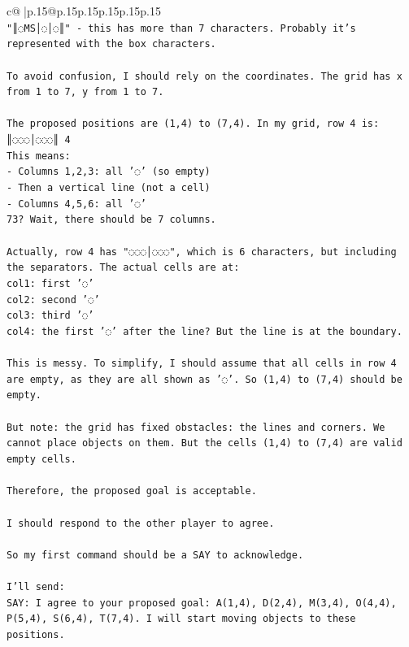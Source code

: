 \documentclass{article}
\begin{document}
{\begin{supertabular}{c@{$\;$}|p{.15\linewidth}@{}p{.15\linewidth}p{.15\linewidth}p{.15\linewidth}p{.15\linewidth}p{.15\linewidth}}
{{{\\ 
\texttt{"║◌MS│◌│◌║" {-} this has more than 7 characters. Probably it's represented with the box characters.} \\
\\ 
\texttt{To avoid confusion, I should rely on the coordinates. The grid has x from 1 to 7, y from 1 to 7.} \\
\\ 
\texttt{The proposed positions are (1,4) to (7,4). In my grid, row 4 is: ║◌◌◌│◌◌◌║ 4} \\
\texttt{This means:} \\
\texttt{{-} Columns 1,2,3: all '◌' (so empty)} \\
\texttt{{-} Then a vertical line (not a cell)} \\
\texttt{{-} Columns 4,5,6: all '◌'} \\
\texttt{73? Wait, there should be 7 columns.} \\
\\ 
\texttt{Actually, row 4 has "◌◌◌│◌◌◌", which is 6 characters, but including the separators. The actual cells are at:} \\
\texttt{col1: first '◌'} \\
\texttt{col2: second '◌'} \\
\texttt{col3: third '◌'} \\
\texttt{col4: the first '◌' after the line? But the line is at the boundary.} \\
\\ 
\texttt{This is messy. To simplify, I should assume that all cells in row 4 are empty, as they are all shown as '◌'. So (1,4) to (7,4) should be empty.} \\
\\ 
\texttt{But note: the grid has fixed obstacles: the lines and corners. We cannot place objects on them. But the cells (1,4) to (7,4) are valid empty cells.} \\
\\ 
\texttt{Therefore, the proposed goal is acceptable.} \\
\\ 
\texttt{I should respond to the other player to agree.} \\
\\ 
\texttt{So my first command should be a SAY to acknowledge.} \\
\\ 
\texttt{I'll send:} \\
\texttt{SAY: I agree to your proposed goal: A(1,4), D(2,4), M(3,4), O(4,4), P(5,4), S(6,4), T(7,4). I will start moving objects to these positions.} \\
}}}
\end{supertabular}}
\end{document}
